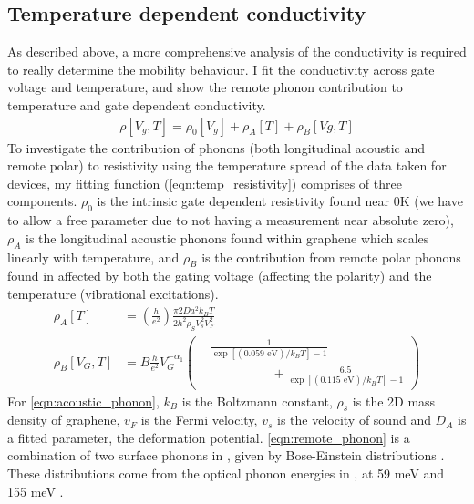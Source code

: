 \documentclass[../Matt_Gebert_Honours_Thesis.tex]{subfiles}
\begin{document}
\subsection{Temperature dependent conductivity}
As described above, a more comprehensive analysis of the conductivity is required to really determine the mobility behaviour. I fit the conductivity across gate voltage and temperature, and show the remote phonon contribution to temperature and gate dependent conductivity.
\begin{align}
\rho[V_g,T] = \rho_0[V_g] + \rho_A[T] + \rho_B[Vg,T] \label{eqn:temp_resistivity}
\end{align}
To investigate the contribution of phonons (both longitudinal acoustic and remote polar) to resistivity using the temperature spread of the data taken for devices, my fitting function (\cref{eqn:temp_resistivity}) comprises of three components. $\rho_0$ is the intrinsic gate dependent resistivity found near 0K (we have to allow a free parameter due to not having a measurement near absolute zero), $\rho_A$ is the longitudinal acoustic phonons found within graphene which scales linearly with temperature, and $\rho_B$ is the contribution from remote polar phonons found in \silicondioxide{} affected by both the gating voltage (affecting the polarity) and the temperature (vibrational excitations).
\begin{align}
\rho_A[T] &= \left(\frac{h}{e^2}\right) \frac{\pi2 Da^2 k_B T}{2 h^2 \rho_S V_s^2 V_F^2}\label{eqn:acoustic_phonon}\\
\rho_B[V_G,T]&= B \frac{h}{e^2} V_G^{-\alpha_1} \left(\begin{aligned}
&\frac{1}{\exp\left[(0.059\text{ eV})/k_B T\right]-1}\\ &\hspace{2cm}+\frac{6.5}{\exp\left[(0.115\text{ eV})/k_B T\right]-1}
\end{aligned}\right)\label{eqn:remote_phonon}
\end{align}
For \cref{eqn:acoustic_phonon}, $k_B$ is the Boltzmann constant, $\rho_s$ is the 2D mass density of graphene, $v_F$ is the Fermi velocity, $v_s$ is the velocity of sound and $D_A$ is a fitted parameter, the deformation potential.
\cref{eqn:remote_phonon} is a combination of two surface phonons in \silicondioxide{}, given by Bose-Einstein distributions \cite{chen_intrinsic_2008}. These distributions come from the optical phonon energies in \silicondioxide{}, at 59 meV and 155 meV \cite{fratini_substrate-limited_2008}.
\end{document}
